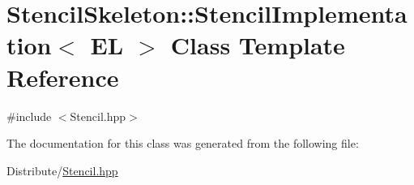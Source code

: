 \hypertarget{classStencilSkeleton_1_1StencilImplementation}{\section{Stencil\-Skeleton\-:\-:Stencil\-Implementation$<$ E\-L $>$ Class Template Reference}
\label{classStencilSkeleton_1_1StencilImplementation}
}


{\ttfamily \#include $<$Stencil.\-hpp$>$}



The documentation for this class was generated from the following file\-:\begin{DoxyCompactItemize}
\item 
Distribute/\hyperlink{Stencil_8hpp}{Stencil.\-hpp}\end{DoxyCompactItemize}
